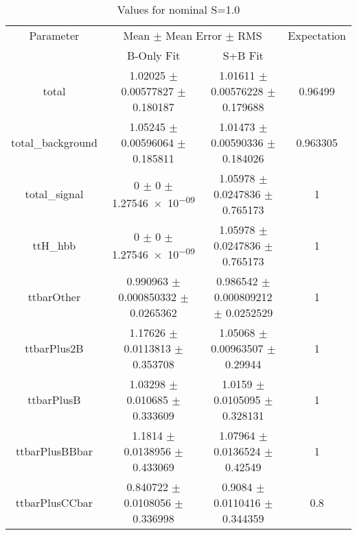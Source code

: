 \begin{table}
\centering
\caption{Values for nominal S=1.0}
\begin{tabular}{cccc}
\toprule
Parameter & \multicolumn{2}{c}{Mean $\pm$ Mean Error $\pm$ RMS} & Expectation\\
 & B-Only Fit & S+B Fit & \\
\midrule
total & \num{1.02025} $\pm$ \num{0.00577827} $\pm$ \num{0.180187} & \num{1.01611} $\pm$ \num{0.00576228} $\pm$ \num{0.179688} & \num{0.96499}\\
total\_background & \num{1.05245} $\pm$ \num{0.00596064} $\pm$ \num{0.185811} & \num{1.01473} $\pm$ \num{0.00590336} $\pm$ \num{0.184026} & \num{0.963305}\\
total\_signal & \num{0} $\pm$ \num{0} $\pm$ \num{1.27546e-09} & \num{1.05978} $\pm$ \num{0.0247836} $\pm$ \num{0.765173} & \num{1}\\
ttH\_hbb & \num{0} $\pm$ \num{0} $\pm$ \num{1.27546e-09} & \num{1.05978} $\pm$ \num{0.0247836} $\pm$ \num{0.765173} & \num{1}\\
ttbarOther & \num{0.990963} $\pm$ \num{0.000850332} $\pm$ \num{0.0265362} & \num{0.986542} $\pm$ \num{0.000809212} $\pm$ \num{0.0252529} & \num{1}\\
ttbarPlus2B & \num{1.17626} $\pm$ \num{0.0113813} $\pm$ \num{0.353708} & \num{1.05068} $\pm$ \num{0.00963507} $\pm$ \num{0.29944} & \num{1}\\
ttbarPlusB & \num{1.03298} $\pm$ \num{0.010685} $\pm$ \num{0.333609} & \num{1.0159} $\pm$ \num{0.0105095} $\pm$ \num{0.328131} & \num{1}\\
ttbarPlusBBbar & \num{1.1814} $\pm$ \num{0.0138956} $\pm$ \num{0.433069} & \num{1.07964} $\pm$ \num{0.0136524} $\pm$ \num{0.42549} & \num{1}\\
ttbarPlusCCbar & \num{0.840722} $\pm$ \num{0.0108056} $\pm$ \num{0.336998} & \num{0.9084} $\pm$ \num{0.0110416} $\pm$ \num{0.344359} & \num{0.8}\\
\bottomrule
\end{tabular}
\end{table}